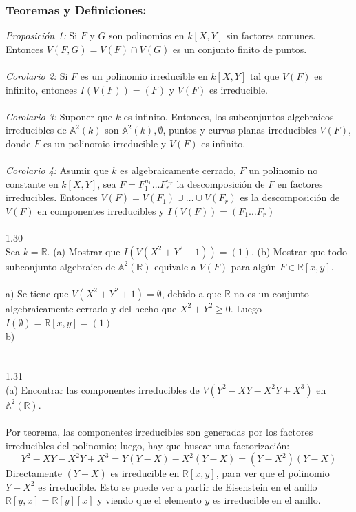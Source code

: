 \documentclass{article}
\newcommand{\R}{\mathbb{R}}
\newcommand{\A}{\mathbb{A}}
\begin{document}
\subsubsection*{Teoremas y Definiciones:}
\textit{Proposición 1:} Si $F$ y $G$ son polinomios en $k[X,Y]$ sin factores comunes. Entonces $V(F,G)=V(F) \cap V(G)$ es un conjunto finito de puntos.
\\
\\
\textit{Corolario 2:} Si $F$ es un polinomio irreducible en $k[X,Y]$ tal que $V(F)$ es infinito, entonces $I(V(F))=(F)$ y $V(F)$ es irreducible.
\\
\\
\textit{Corolario 3:} Suponer que $k$ es infinito. Entonces, los subconjuntos algebraicos irreducibles de $\A^{2}(k)$ son $\A^{2}(k), \emptyset$, puntos y curvas planas irreducibles $V(F)$, donde $F$ es un polinomio irreducible y $V(F)$ es infinito.
\\
\\
\textit{Corolario 4:} Asumir que $k$ es algebraicamente cerrado, $F$ un polinomio no constante en $k[X,Y]$, sea $F=F_{1}^{n_1} \dots F_{r}^{n_{r}}$ la descomposición de $F$ en factores irreducibles. Entonces $V(F)=V(F_1) \cup \dots \cup V(F_r)$ es la descomposición de $V(F)$ en componentes irreducibles y $I(V(F))=(F_1 \dots F_r)$
\\
\\
1.30
\\
Sea $k=\R$. (a) Mostrar que $I(V(X^2+Y^2+1))=(1)$. (b) Mostrar que todo subconjunto algebraico de $\A^2(\R)$ equivale a $V(F)$ para algún $F \in \R[x,y]$.
\\
\\
a) Se tiene que $V(X^2+Y^2+1)=\emptyset$, debido a que $\R$ no es un conjunto algebraicamente cerrado y del hecho que $X^2+Y^2 \geq 0$. Luego $I(\emptyset)=\R[x,y]=(1)$
\\
b)
\\
\\
\\
1.31
\\
(a) Encontrar las componentes irreducibles de $V(Y^2-XY-X^2Y+X^3)$ en $\A^{2}(\R)$.
\\
\\
Por teorema, las componentes irreducibles son generadas por los factores irreducibles del polinomio; luego, hay que buscar una factorización:
\begin{equation*}
    Y^2-XY-X^2Y+X^3=Y(Y-X)-X^2(Y-X)=(Y-X^2)(Y-X)
\end{equation*}
Directamente $(Y-X)$ es irreducible en $\R[x,y]$, para ver que el polinomio $Y-X^2$ es irreducible. Esto se puede ver a partir de Eisenstein en el anillo $\R[y,x]=\R[y][x]$  y viendo que el elemento $y$ es irreducible en el anillo.
\end{document}

